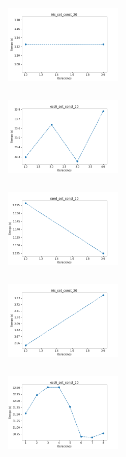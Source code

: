 \begin{figure}[H]    
    \centering
    \begin{subfigure}
        \centering
        \includegraphics[width=0.32\textwidth]{img/copkm/iris_set_const_20_949004259_time.png}
    \end{subfigure}
    \hfill
    \begin{subfigure}
        \centering
        \includegraphics[width=0.32\textwidth]{img/copkm/ecoli_set_const_20_949004259_time.png}
    \end{subfigure}
    \hfill
    \begin{subfigure}
        \centering
        \includegraphics[width=0.32\textwidth]{img/copkm/rand_set_const_20_949004259_time.png}
    \end{subfigure}
    \hfill
    \begin{subfigure}
        \centering
        \includegraphics[width=0.32\textwidth]{img/copkm/iris_set_const_20_589741062_time.png}
    \end{subfigure}
    \hfill
    \begin{subfigure}
        \centering
        \includegraphics[width=0.32\textwidth]{img/copkm/ecoli_set_const_20_589741062_time.png}

\end{subfigure}
\end{figure}
